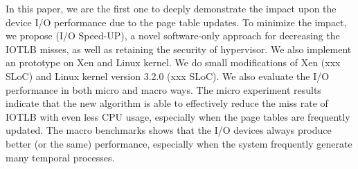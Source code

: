 \documentclass[letterpaper,twocolumn,10pt]{article}
\begin{document}
In this paper, we are the first one to deeply demonstrate the impact upon the device I/O performance due to the page table updates. To minimize the impact, we propose \name(I/O Speed-UP), a novel software-only approach for decreasing the IOTLB misses, as well as retaining the security of hypervisor.
We also implement an prototype on Xen and Linux kernel. We do small modifications of Xen (xxx SLoC) and Linux kernel version 3.2.0 (xxx SLoC). We also evaluate the I/O performance in both micro and macro ways. The micro experiment results indicate that the new algorithm is able to effectively reduce the miss rate of IOTLB with even less CPU usage, especially when the page tables are frequently updated. The macro benchmarks shows that the I/O devices always produce better (or the same) performance, especially when the system frequently generate many temporal processes.






%
%
%

%
%
%






{


}
\end{document}
